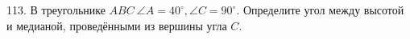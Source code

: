 113. В треугольнике $ABC\ \angle A=40^\circ, \angle C=90^\circ.$ Определите угол между высотой и медианой, проведёнными из вершины угла $C.$\\
